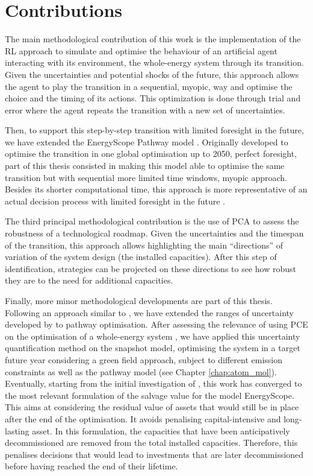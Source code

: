 \section*{Contributions}
\label{sec:meth:contributions}
The main methodological contribution of this work is the implementation of the \gls{RL} approach to simulate and optimise the behaviour of an artificial agent interacting with its environment, \ie the whole-energy system through its transition. Given the uncertainties and potential shocks of the future, this approach allows the agent to play the transition in a sequential, \ie myopic, way and optimise the choice and the timing of its actions. This optimization is done through trial and error where the agent repeats the transition with a new set of uncertainties. 

Then, to support this step-by-step transition with limited foresight in the future, we have extended the EnergyScope Pathway model \cite{limpens2021generating}. Originally developed to optimise the transition in one global optimisation up to 2050, \ie perfect foresight, part of this thesis consisted in making this model able to optimise the same transition but with sequential more limited time windows, \ie myopic approach. Besides its shorter computational time, this approach is more representative of an actual decision process with limited foresight in the future \cite{babrowski2014reducing}.

The third principal methodological contribution is the use of \acrfull{PCA} to assess the robustness of a technological roadmap. Given the uncertainties and the timespan of the transition, this approach allows highlighting the main ``directions'' of variation of the system design (\ie the installed capacities). After this step of identification, strategies can be projected on these directions to see how robust they are to the need for additional capacities.

Finally, more minor methodological developments are part of this thesis. Following an approach similar to \citet{guevara2022modeling}, we have extended the ranges of uncertainty developed by \citet{Moret2017} to pathway optimisation. After assessing the relevance of using \acrfull{PCE} on the optimisation of a whole-energy system \cite{limpens2020impact}, we have applied this uncertainty quantification method on the snapshot model, \ie optimising the system in a target future year considering a green field approach, subject to different emission constraints \cite{rixhon2021role} as well as the pathway model (see Chapter \ref{chap:atom_mol}). Eventually, starting from the initial investigation of \citet{goffauxpathway}, this work has converged to the most relevant formulation of the salvage value for the model EnergyScope. This aims at considering the residual value of assets that would still be in place after the end of the optimisation. It avoids penalising capital-intensive and long-lasting asset. In this formulation, the capacities that have been anticipatively decommissioned are removed from the total installed capacities. Therefore, this penalises decisions that would lead to investments that are later decommissioned before having reached the end of their lifetime.

